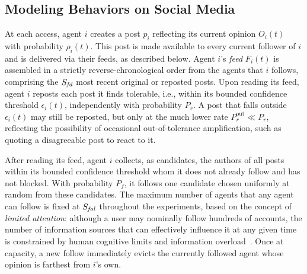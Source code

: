 \documentclass{svproc}
\def\post{\rho}                 %
\def\BoundedConfidence{\epsilon} %
\def\feed{F}                    %
\def\maxfollower{S_{\it fol}}    %
\def\maxfeed{S_{\it fd}}         %
\begin{document}
\subsection{Modeling Behaviors on Social Media}\label{sec:model-behaviors}
At each access, agent $i$ creates a post $p_i$ reflecting its current
opinion $O_i(t)$ with probability $\post_i(t)$. This post is made
available to every current follower of $i$ and is delivered via their
feeds, as described below.
Agent $i$'s {\em feed} $\feed_i(t)$ is assembled
in a strictly reverse-chronological order from the agents that $i$ follows,
comprising the $\maxfeed$ most recent original or reposted posts.
Upon reading its feed, agent $i$ reposts each post it finds tolerable,
i.e., within its bounded confidence threshold
$\BoundedConfidence_i(t)$, independently with probability $P_r$. A
post that falls outside $\BoundedConfidence_i(t)$ may still be
reposted, but only at the much lower rate $P_r^{\text{out}}\ll P_r$,
reflecting the possibility of occasional out-of-tolerance
amplification, such as quoting a disagreeable post to react to it.
\par


After reading its feed, agent $i$ collects, as candidates, the authors
of all posts within its bounded confidence threshold whom it does not
already follow and has not blocked. With probability $P_f$, it follows
one candidate chosen uniformly at random from these candidates. The
maximum number of agents that any agent can follow is fixed at
$\maxfollower$ throughout the experiments, based on the concept of
\emph{limited attention}: although a user may nominally follow
hundreds of accounts, the number of information sources that can
effectively influence it at any given time is constrained by human
cognitive limits and information
overload~\cite{goncalves2011,weng2012}. Once at capacity, a new follow
immediately evicts the currently followed agent whose opinion is
farthest from $i$'s own.
\par
\end{document}
